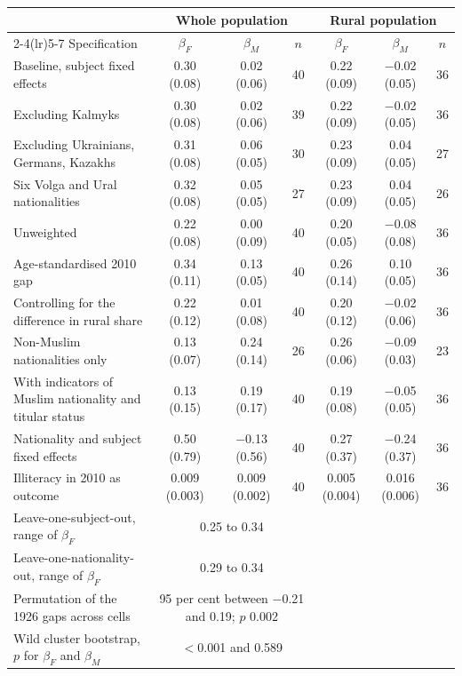 \begin{tabular}{lcccccc}
\toprule
 & \multicolumn{3}{c}{Whole population} & \multicolumn{3}{c}{Rural population} \\
\cmidrule(lr){2-4}\cmidrule(lr){5-7}
Specification & $\beta_F$ & $\beta_M$ & $n$ & $\beta_F$ & $\beta_M$ & $n$ \\
\midrule
Baseline, subject fixed effects & 0.30 (0.08) & 0.02 (0.06) & 40 & 0.22 (0.09) & $-$0.02 (0.05) & 36 \\
Excluding Kalmyks & 0.30 (0.08) & 0.02 (0.06) & 39 & 0.22 (0.09) & $-$0.02 (0.05) & 36 \\
Excluding Ukrainians, Germans, Kazakhs & 0.31 (0.08) & 0.06 (0.05) & 30 & 0.23 (0.09) & 0.04 (0.05) & 27 \\
Six Volga and Ural nationalities & 0.32 (0.08) & 0.05 (0.05) & 27 & 0.23 (0.09) & 0.04 (0.05) & 26 \\
Unweighted & 0.22 (0.08) & 0.00 (0.09) & 40 & 0.20 (0.05) & $-$0.08 (0.08) & 36 \\
Age-standardised 2010 gap & 0.34 (0.11) & 0.13 (0.05) & 40 & 0.26 (0.14) & 0.10 (0.05) & 36 \\
Controlling for the difference in rural share & 0.22 (0.12) & 0.01 (0.08) & 40 & 0.20 (0.12) & $-$0.02 (0.06) & 36 \\
Non-Muslim nationalities only & 0.13 (0.07) & 0.24 (0.14) & 26 & 0.26 (0.06) & $-$0.09 (0.03) & 23 \\
With indicators of Muslim nationality and titular status & 0.13 (0.15) & 0.19 (0.17) & 40 & 0.19 (0.08) & $-$0.05 (0.05) & 36 \\
Nationality and subject fixed effects & 0.50 (0.79) & $-$0.13 (0.56) & 40 & 0.27 (0.37) & $-$0.24 (0.37) & 36 \\
Illiteracy in 2010 as outcome & 0.009 (0.003) & 0.009 (0.002) & 40 & 0.005 (0.004) & 0.016 (0.006) & 36 \\
\midrule
Leave-one-subject-out, range of $\beta_F$ & \multicolumn{3}{c}{0.25 to 0.34} & & & \\
Leave-one-nationality-out, range of $\beta_F$ & \multicolumn{3}{c}{0.29 to 0.34} & & & \\
Permutation of the 1926 gaps across cells & \multicolumn{3}{c}{95 per cent between $-$0.21 and 0.19; $p$ 0.002} & & & \\
Wild cluster bootstrap, $p$ for $\beta_F$ and $\beta_M$ & \multicolumn{3}{c}{$<$0.001 and 0.589} & & & \\
\bottomrule
\end{tabular}
